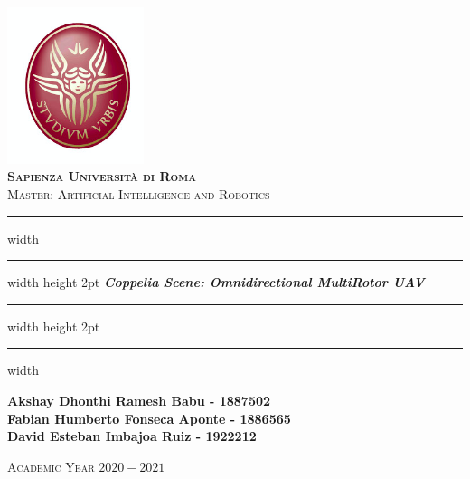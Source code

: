 \documentclass[a4paper, 12pt, oneside]{book}
\begin{document}

\begin{titlepage}
	\centering
	\vspace*{1mm}
	\includegraphics[width= 4cm ]{figures/Logo.png}\\
	\vspace*{1cm}
	\huge \textbf{\textsc{Sapienza Università di Roma}}\\
	\Large \textsc{Master: Artificial Intelligence and Robotics}
	\centering
	\vspace*{5mm}
	\vspace*{1cm}
	
	\vspace*{1.5cm}
	\hrule width \hsize \kern 1mm \hrule width \hsize height 2pt
	\vspace*{10mm}
	\Huge \emph{\textbf{Coppelia Scene: Omnidirectional MultiRotor UAV}}
	\vspace*{10mm}
	\hrule width \hsize height 2pt
	\vspace*{1mm}
	\hrule width \hsize \kern 1mm
	
	\vspace*{10mm}
    \begin{center}
        \Large \textbf{Akshay Dhonthi Ramesh Babu - 1887502}\\
        \Large \textbf{Fabian Humberto Fonseca Aponte - 1886565}\\
		\Large \textbf{David Esteban Imbajoa Ruiz - 1922212}
		\end{center}
	
	\vspace*{20mm}
	\Large \textsc{Academic Year $2020-2021$}
	
\end{titlepage}
{}
\pagestyle{empty}
\clearpage
\tableofcontents
\thispagestyle{empty}
\end{document}
